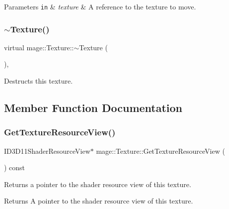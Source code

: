 \begin{DoxyParams}[1]{Parameters}
\mbox{\tt in}  & {\em texture} & A reference to the texture to move. \\
\hline
\end{DoxyParams}
\hypertarget{classmage_1_1_texture_a81664804ac0259e8c67851409ee106fa}{}\label{classmage_1_1_texture_a81664804ac0259e8c67851409ee106fa} 
\subsubsection{\texorpdfstring{$\sim$\+Texture()}{~Texture()}}
{\footnotesize\ttfamily virtual mage\+::\+Texture\+::$\sim$\+Texture (\begin{DoxyParamCaption}{ }\end{DoxyParamCaption})\hspace{0.3cm}{\ttfamily [virtual]}, {\ttfamily [default]}}

Destructs this texture. 

\subsection{Member Function Documentation}
\hypertarget{classmage_1_1_texture_a8b04efb947c49819642f86c8a16f813b}{}\label{classmage_1_1_texture_a8b04efb947c49819642f86c8a16f813b} 
\subsubsection{\texorpdfstring{Get\+Texture\+Resource\+View()}{GetTextureResourceView()}}
{\footnotesize\ttfamily I\+D3\+D11\+Shader\+Resource\+View$\ast$ mage\+::\+Texture\+::\+Get\+Texture\+Resource\+View (\begin{DoxyParamCaption}{ }\end{DoxyParamCaption}) const}

Returns a pointer to the shader resource view of this texture.

\begin{DoxyReturn}{Returns}
A pointer to the shader resource view of this texture. 
\end{DoxyReturn}
\hypertarget{classmage_1_1_texture_ae7a45b80e575237d218dc9c6f059e87c}{}\label{classmage_1_1_texture_ae7a45b80e575237d218dc9c6f059e87c} 
